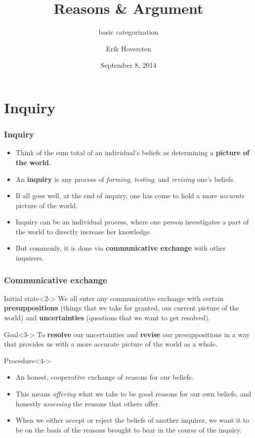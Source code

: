 \documentclass[10pt,letterpaper,xcolor=dvipsnames,handout]{beamer}
\title{Reasons \& Argument}
\subtitle{basic categorization}
\author[Hoversten]{Erik Hoversten}
\institute[lrp-f14]{Logic, reason, and persuasion: fall 2014 \\ Rutgers University}
\date[09/08/2014]{September 8, 2014}
\begin{document}
\begin{frame}
\titlepage
\end{frame}

\section{Inquiry}

\begin{frame}
\frametitle{Inquiry}

  \begin{itemize}
    \item<2-> Think of the sum total of an individual's beliefs as determining a \textbf{picture of the world}.
    \item<3-> An \textbf{inquiry} is any process of \textit{forming}, \textit{testing}, and \textit{revising} one's beliefs.
    \item<4-> If all goes well, at the end of inquiry, one has come to hold a more \textit{accurate} picture of the world.
    \item<5-> Inquiry can be an individual process, where one person investigates a part of the world to directly increase her knowledge.
    \item<6-> But commonly, it is done via \textbf{communicative exchange} with other inquirers.
  \end{itemize}
  
\end{frame}

\begin{frame}
\frametitle{Communicative exchange}
\small

\begin{block}{Initial state}<2->
  We all enter any communicative exchange with certain \textbf{presuppositions} (things that we take for granted, our current picture of the world) and \textbf{uncertainties} (questions that we want to get resolved).
\end{block}

\begin{block}{Goal}<3->
  To \textbf{resolve} our uncertainties and \textbf{revise} our presuppositions in a way that provides us with a more accurate picture of the world as a whole.
\end{block}

\begin{block}{Procedure}<4->
  \begin{itemize}
    \item An honest, cooperative exchange of reasons for our beliefs.
    \item This means \textit{offering} what we take to be good reasons for our own beliefs, and honestly \textit{assessing} the reasons that others offer.
    \item When we either accept or reject the beliefs of another inquirer, we want it to be on the basis of the reasons brought to bear in the course of the inquiry.
  \end{itemize}
\end{block}

\end{frame}
\end{document}
